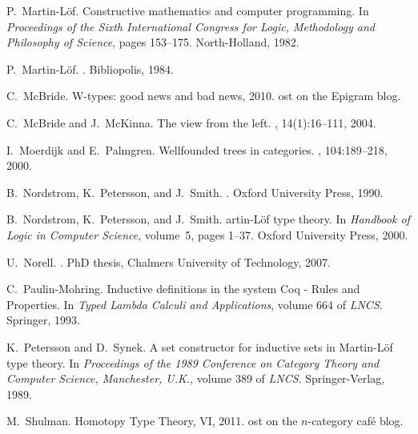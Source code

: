 \documentclass{article}
\theoremstyle{remark}
\theoremstyle{definition}
\begin{document}
\begin{thebibliography}{10}
P.~Martin-{L}\"of.
\newblock Constructive mathematics and computer programming.
\newblock In {\em Proceedings of the Sixth International Congress for Logic,
  Methodology and Philosophy of Science}, pages 153--175. North-Holland, 1982.

P.~Martin-L{\"o}f.
.
\newblock Bibliopolis, 1984.

C.~McBride.
\newblock W-types: good news and bad news, 2010.
ost on the {E}pigram blog.

C.~McBride and J.~McKinna.
\newblock The view from the left.
, 14(1):16--111, 2004.

I.~Moerdijk and E.~Palmgren.
\newblock Wellfounded trees in categories.
, 104:189--218, 2000.

B.~Nordstrom, K.~Petersson, and J.~Smith.
.
\newblock Oxford University Press, 1990.

B.~Nordstrom, K.~Petersson, and J.~Smith.
artin-{L}\"of type theory.
\newblock In {\em Handbook of Logic in Computer Science}, volume~5, pages
  1--37. Oxford University Press, 2000.

U.~Norell.
.
\newblock PhD thesis, Chalmers University of Technology, 2007.

C.~Paulin-Mohring.
\newblock Inductive definitions in the system {C}oq - {R}ules and {P}roperties.
\newblock In {\em Typed Lambda Calculi and Applications}, volume 664 of {\em
  LNCS}. Springer, 1993.

K.~Petersson and D.~Synek.
\newblock A set constructor for inductive sets in {M}artin-{L}\"of type theory.
\newblock In {\em Proceedings of the 1989 Conference on Category Theory and
  Computer Science, Manchester, {U.}{K.}}, volume 389 of {\em LNCS}.
  Springer-Verlag, 1989.

M.~Shulman.
\newblock Homotopy {T}ype {T}heory, {VI}, 2011.
ost on the $n$-category caf\'e blog.


\end{thebibliography}
\end{document}
